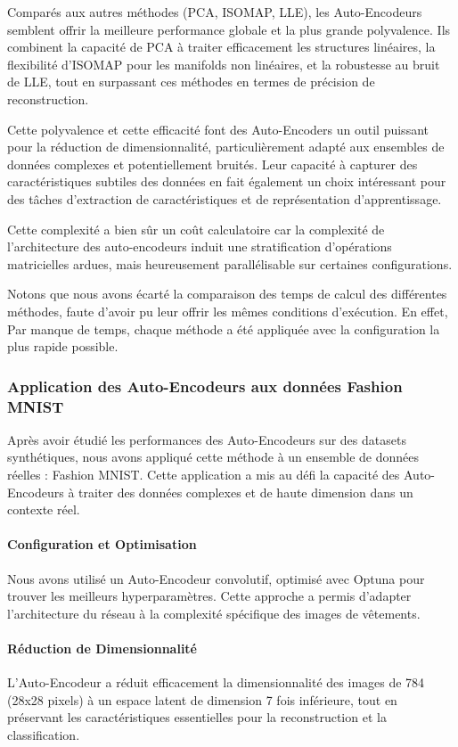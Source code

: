 \documentclass[unnumsec,webpdf,modern,large]{projet_manifold}%
\theoremstyle{thmstyleone}%
\theoremstyle{thmstyletwo}%
\theoremstyle{thmstylethree}%
\begin{document}
Comparés aux autres méthodes (PCA, ISOMAP, LLE), les Auto-Encodeurs semblent offrir la meilleure performance globale et la plus grande polyvalence. Ils combinent la capacité de PCA à traiter efficacement les structures linéaires, la flexibilité d’ISOMAP pour les manifolds non linéaires, et la robustesse au bruit de LLE, tout en surpassant ces méthodes en termes de précision de reconstruction.

Cette polyvalence et cette efficacité font des Auto-Encoders un outil puissant pour la réduction de dimensionnalité, particulièrement adapté aux ensembles de données complexes et potentiellement bruités. Leur capacité à capturer des caractéristiques subtiles des données en fait également un choix intéressant pour des tâches d'extraction de caractéristiques et de représentation d'apprentissage.

Cette complexité a bien sûr un coût calculatoire car la complexité de l'architecture des auto-encodeurs induit une stratification d'opérations matricielles ardues, mais heureusement parallélisable sur certaines configurations.

Notons que nous avons écarté la comparaison des temps de calcul des différentes méthodes, faute d'avoir pu leur offrir les mêmes conditions d'exécution. En effet, Par manque de temps, chaque méthode a été appliquée avec la configuration la plus rapide possible.

\subsubsection{Application des Auto-Encodeurs aux données Fashion MNIST}

Après avoir étudié les performances des Auto-Encodeurs sur des datasets synthétiques, nous avons appliqué cette méthode à un ensemble de données réelles : Fashion MNIST. Cette application a mis au défi la capacité des Auto-Encodeurs à traiter des données complexes et de haute dimension dans un contexte réel.

\paragraph{Configuration et Optimisation}
Nous avons utilisé un Auto-Encodeur convolutif, optimisé avec Optuna pour trouver les meilleurs hyperparamètres. Cette approche a permis d'adapter l'architecture du réseau à la complexité spécifique des images de vêtements.

\paragraph{Réduction de Dimensionnalité}
L'Auto-Encodeur a réduit efficacement la dimensionnalité des images de 784 (28x28 pixels) à un espace latent de dimension 7 fois inférieure, tout en préservant les caractéristiques essentielles pour la reconstruction et la classification.
\end{document}
